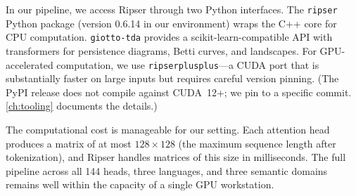 In our pipeline, we access Ripser through two Python interfaces.
The \texttt{ripser} Python package (version 0.6.14 in our environment)
wraps the C++ core for CPU computation.
\texttt{giotto-tda} \parencite{tauzin2021} provides a scikit-learn-compatible
API with transformers for persistence diagrams, Betti curves, and
landscapes.
For GPU-accelerated computation, we use \texttt{ripserplusplus}---a CUDA
port that is substantially faster on large inputs but requires careful
version pinning.
(The PyPI release does not compile against CUDA~12+; we pin to a
specific commit.
\autoref{ch:tooling} documents the details.)

The computational cost is manageable for our setting.
Each attention head produces a matrix of at most $128 \times 128$
(the maximum sequence length after tokenization), and Ripser handles
matrices of this size in milliseconds.
The full pipeline across all 144 heads, three languages, and three
semantic domains remains well within the capacity of a single GPU
workstation.

